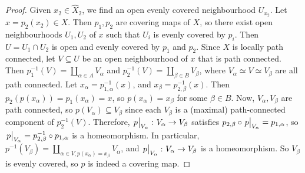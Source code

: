 \begin{proof}
	Given \( x_2 \in \hat X_2 \), we find an open evenly covered neighbourhood \( U_{x_2} \).
	Let \( x = p_2(x_2) \in X \).
	Then \( p_1, p_2 \) are covering maps of \( X \), so there exist open neighbourhoods \( U_1, U_2 \) of \( x \) such that \( U_i \) is evenly covered by \( p_i \).
	Then \( U = U_1 \cap U_2 \) is open and evenly covered by \( p_1 \) and \( p_2 \).
	Since \( X \) is locally path connected, let \( V \subseteq U \) be an open neighbourhood of \( x \) that is path connected.
	Then \( p_1^{-1}(V) = \coprod_{\alpha \in A} V_\alpha \) and \( p_2^{-1}(V) = \coprod_{\beta \in B} V_\beta \), where \( V_\alpha \simeq V \simeq V_\beta \) are all path connected.
	Let \( x_\alpha = p_{1,\alpha}^{-1}(x) \), and \( x_\beta = p_{2,\beta}^{-1}(x) \).
	Then \( p_2(p(x_\alpha)) = p_1(x_\alpha) = x \), so \( p(x_\alpha) = x_\beta \) for some \( \beta \in B \).
	Now, \( V_\alpha, V_\beta \) are path connected, so \( p(V_\alpha) \subseteq V_\beta \) since each \( V_\beta \) is a (maximal) path-connected component of \( p_2^{-1}(V) \).
	Therefore, \( \eval{p}_{V_\alpha} \colon V_\alpha \to V_\beta \) satisfies \( p_{2,\beta} \circ \eval{p}_{V_\alpha} = p_{1,\alpha} \), so \( \eval{p}_{V_\alpha} = p_{2,\beta}^{-1} \circ p_{1,\alpha} \) is a homeomorphism.
	In particular, \( p^{-1}(V_\beta) = \coprod_{\alpha \in V, p(x_\alpha) = x_\beta} V_\alpha \), and \( \eval{p}_{V_\alpha} \colon V_\alpha \to V_\beta \) is a homeomorphism.
	So \( V_\beta \) is evenly covered, so \( p \) is indeed a covering map.
\end{proof}

